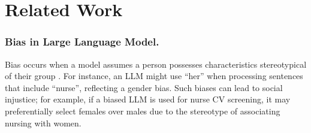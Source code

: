 \section{Related Work}
\subsubsection{{Bias in Large Language Model.}}
Bias occurs when a model assumes a person possesses characteristics stereotypical of their group \cite{liSurveyFairnessLarge2024}. For instance, an LLM might use ``her'' when processing sentences that include ``nurse'', reflecting a gender bias. Such biases can lead to social injustice; for example, if a biased LLM is used for nurse CV screening, it may preferentially select females over males due to the stereotype of associating nursing with women.

